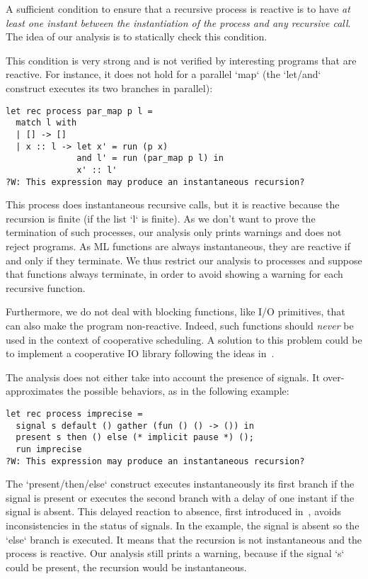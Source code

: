 \documentclass[9pt]{sigplanconf}
\begin{document}
A sufficient condition to ensure that a recursive process is reactive is to have \emph{at least one instant between the instantiation of the process and any recursive call}. The idea of our analysis is to statically check this condition.

This condition is very strong and is not verified by interesting programs that are reactive. For instance, it does not hold for a parallel `map` (the `let/and` construct executes its two branches in parallel):
\begin{lstlisting}
let rec process par_map p l =
  match l with
  | [] -> []
  | x :: l -> let x' = run (p x)
              and l' = run (par_map p l) in
              x' :: l'
?W: This expression may produce an instantaneous recursion?
\end{lstlisting}
This process does instantaneous recursive calls, but it is reactive because the recursion is finite (if the list `l` is finite). As we don't want to prove the termination of such processes, our analysis only prints warnings and does not reject programs.
As ML functions are always instantaneous, they are reactive if and only if they terminate. %
We thus restrict our analysis to processes and suppose that functions always terminate, in order to avoid showing a warning for each recursive function.

Furthermore, we do not deal with blocking functions, like I/O primitives, that can also make the program non-reactive. Indeed, such functions should \emph{never} be used in the context of cooperative scheduling. A solution to this problem could be to implement a cooperative IO library following the ideas in~\cite{Marlow:2004}.

The analysis does not either take into account the presence of signals. It over-approximates the possible behaviors, as in the following example:
\begin{lstlisting}
let rec process imprecise =
  signal s default () gather (fun () () -> ()) in
  present s then () else (* implicit pause *) ();
  run imprecise
?W: This expression may produce an instantaneous recursion?
\end{lstlisting}
%
The `present/then/else` construct executes instantaneously its first branch if the signal is present or executes the second branch with a delay of one instant if the signal is absent. This delayed reaction to absence, first introduced in~\cite{Boussinot:1991}, avoids inconsistencies in the status of signals. In the example, the signal is absent so the `else` branch is executed. It means that the recursion is not instantaneous and the process is reactive. Our analysis still prints a warning, because if the signal `s` could be present, the recursion would be instantaneous.
\end{document}
